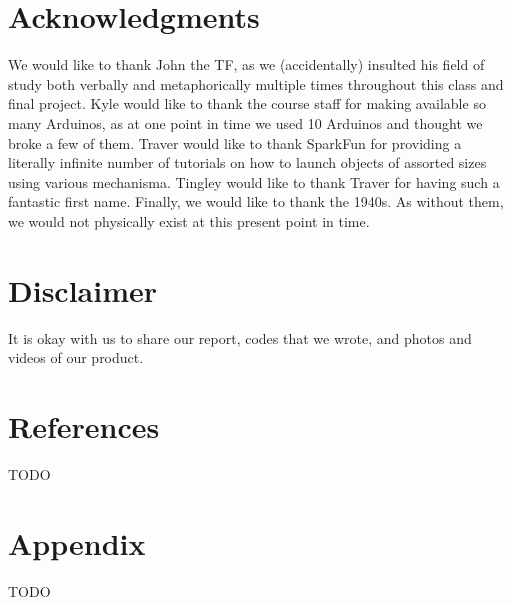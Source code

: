 \documentclass{es50report}
\begin{document}
    \section{Acknowledgments}
        We would like to thank John the TF, as we (accidentally) insulted his field of study both verbally and metaphorically multiple times throughout this class and final project. Kyle would like to thank the course staff for making available so many Arduinos, as at one point in time we used 10 Arduinos and thought we broke a few of them. Traver would like to thank SparkFun for providing a literally infinite number of tutorials on how to launch objects of assorted sizes using various mechanisma. Tingley would like to thank Traver for having such a fantastic first name. Finally, we would like to thank the 1940s. As without them, we would not physically exist at this present point in time.

    \section{Disclaimer}
        It is okay with us to share our report, codes that we wrote, and photos and videos of our product.

    \section{References}
    TODO

    \appendix
    \section{Appendix}
    TODO
\end{document}
